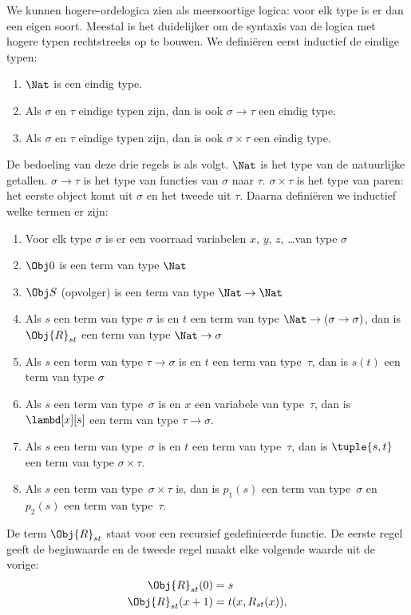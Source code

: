 \documentclass[../../../include/open-logic-section]{subfiles}
\begin{document}
We kunnen hogere-ordelogica zien als meersoortige logica: voor elk type is er
dan een eigen soort. Meestal is het duidelijker om de syntaxis van de logica
met hogere typen rechtstreeks op te bouwen. We definiëren eerst inductief de
eindige typen:
\begin{enumerate}
\item $\Nat$ is een eindig type.
\item Als $\sigma$ en $\tau$ eindige typen zijn, dan is ook $\sigma
  \to \tau$ een eindig type.
\item Als $\sigma$ en $\tau$ eindige typen zijn, dan is ook $\sigma \times
  \tau$ een eindig type.
\end{enumerate}
De bedoeling van deze drie regels is als volgt. $\Nat$ is het type van de
natuurlijke getallen. $\sigma \to \tau$ is het type van functies van
$\sigma$ naar $\tau$. $\sigma \times \tau$ is het type van paren: het eerste
object komt uit $\sigma$ en het tweede uit $\tau$. Daarna definiëren we
inductief welke termen er zijn:
\begin{enumerate}
\item Voor elk type $\sigma$ is er een voorraad variabelen $x$, $y$,
  $z$, \dots van type $\sigma$
\item $\Obj 0$ is een term van type $\Nat$
\item $\Obj S$ (opvolger) is een term van type $\Nat \to \Nat$
\item Als $s$ een term van type $\sigma$ is en $t$ een term van type
  $\Nat \to (\sigma \to \sigma)$, dan is $\Obj{R}_{st}$ een term van type
  $\Nat \to \sigma$
\item Als $s$ een term van type $\tau \to \sigma$ is en $t$ een
  term van type~$\tau$, dan is $s(t)$ een term van type $\sigma$
\item Als $s$ een term van type~$\sigma$ is en $x$ een variabele van
  type~$\tau$, dan is $\lambd[x][s]$ een term van type $\tau \to \sigma$.
\item Als $s$ een term van type~$\sigma$ is en $t$ een term van
  type~$\tau$, dan is $\tuple{s, t}$ een term van type $\sigma \times
  \tau$.
\item Als $s$ een term van type~$\sigma \times \tau$ is, dan is $p_1(s)$ een
  term van type~$\sigma$ en $p_2(s)$ een term van type~$\tau$.
\end{enumerate}
De term $\Obj{R}_{st}$ staat voor een recursief gedefinieerde functie. De
eerste regel geeft de beginwaarde en de tweede regel maakt elke volgende
waarde uit de vorige:
\begin{align*}
\Obj{R}_{st}(0) & = s \\
\Obj{R}_{st}(x+1) & = t(x, R_{st}(x)),
\end{align*}
\end{document}
